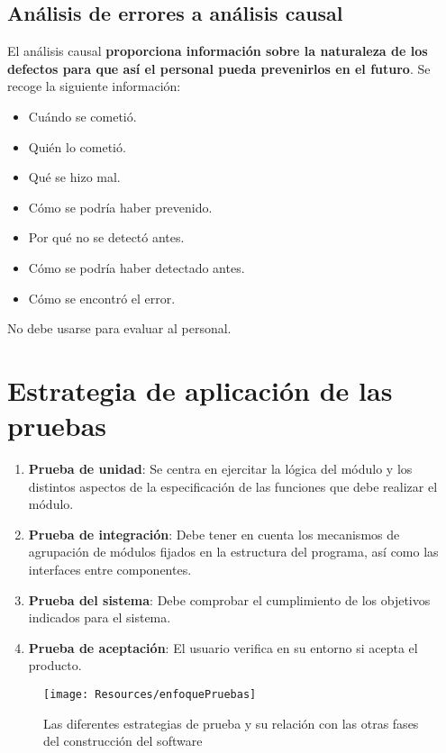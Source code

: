 \subsection{Análisis de errores a análisis causal}
El análisis causal \textbf{proporciona información sobre la naturaleza de los defectos para que así el personal pueda prevenirlos en el futuro}. Se recoge la siguiente información:
\begin{itemize}
    \item Cuándo se cometió.
    \item Quién lo cometió.
    \item Qué se hizo mal.
    \item Cómo se podría haber prevenido.
    \item Por qué no se detectó antes.
    \item Cómo se podría haber detectado antes.
    \item Cómo se encontró el error.
\end{itemize}

No debe usarse para evaluar al personal.

\section{Estrategia de aplicación de las pruebas}
\begin{enumerate} %
    \item \textbf{Prueba de unidad}: Se centra en ejercitar la lógica del módulo y los distintos aspectos de la especificación de las funciones que debe realizar el módulo.
    \item \textbf{Prueba de integración}: Debe tener en cuenta los mecanismos de agrupación de módulos fijados en la estructura del programa, así como las interfaces entre componentes.
    \item \textbf{Prueba del sistema}: Debe comprobar el cumplimiento de los objetivos indicados para el sistema.
    \item \textbf{Prueba de aceptación}: El usuario verifica en su entorno si acepta el producto.
\end{enumerate}
\begin{figure}[H]
    \centering
    \texttt{[image: Resources/enfoquePruebas]}
    \caption{Las diferentes estrategias de prueba y su relación con las otras fases del construcción del software}
    \label{fig:estrategiasPruebas}
\end{figure}


